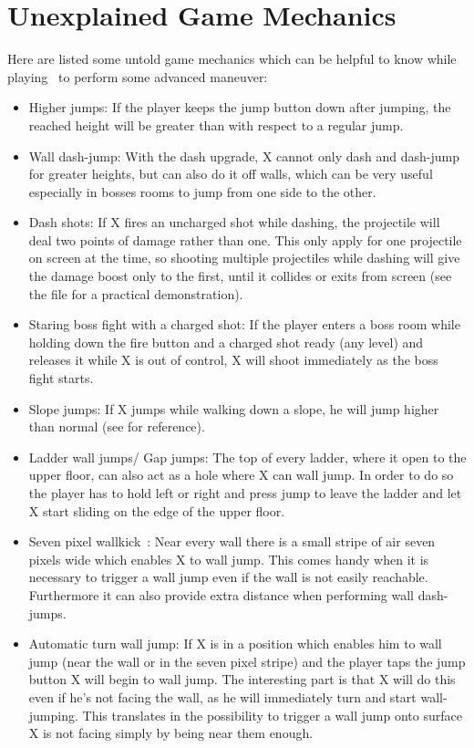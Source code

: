 \section{Unexplained Game Mechanics}\label{X1:game_mechanics}
Here are listed some untold game mechanics which can be helpful to know while playing~\cite{RTA_wiki:X1} to perform some advanced maneuver: 
\begin{itemize}
	\item Higher jumps: If the player keeps the jump button down after jumping, the reached height will be greater than with respect to a regular jump.
	
	\item Wall dash-jump: With the dash upgrade, X cannot only dash and dash-jump for greater heights, but can also do it off walls, which can be very useful especially in bosses rooms to jump from one side to the other.
	
	\item Dash shots: If X fires an uncharged shot while dashing, the projectile will deal two points of damage rather than one. This only apply for one projectile on screen at the time, so shooting multiple projectiles while dashing will give the damage boost only to the first, until it collides or exits from screen (see the file  for a practical demonstration).
	
	\item Staring boss fight with a charged shot: If the player enters a boss room while holding down the fire button and a charged shot ready (any level) and releases it while X is out of control, X will shoot immediately as the boss fight starts.
	
	\item Slope jumps: If X jumps while walking down a slope, he will jump higher than normal (see  for reference).
	
	\item Ladder wall jumps/ Gap jumps: The top of every ladder, where it open to the upper floor, can also act as a hole where X can wall jump. In order to do so the player has to hold left or right and press jump to leave the ladder and let X start sliding on the edge of the upper floor.
	
	\item Seven pixel wallkick~\cite{MMX_RTA_wiki:basics}: Near every wall there is a small stripe of air seven pixels wide which enables X to wall jump. This comes handy when it is necessary to trigger a wall jump even if the wall is not easily reachable. Furthermore it can also provide extra distance when performing wall dash-jumps.
	
	\item Automatic turn wall jump: If X is in a position which enables him to wall jump (near the wall or in the seven pixel stripe) and the player taps the jump button X will begin to wall jump. The interesting part is that X will do this even if he's not facing the wall, as he will immediately turn and start wall-jumping. This translates in the possibility to trigger a wall jump onto surface X is not facing simply by being near them enough.
\end{itemize}

